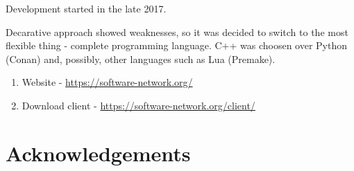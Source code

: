 Development started in the late 2017.

Decarative approach showed weaknesses, so it was decided to switch to the most flexible thing - complete programming language. C++ was choosen over Python (Conan) and, possibly, other languages such as Lua (Premake).





\begin{enumerate}
\item
Website - \url{https://software-network.org/}

\item
Download client - \url{https://software-network.org/client/}
\end{enumerate}


\section*{Acknowledgements}

\undef\sectionToc
